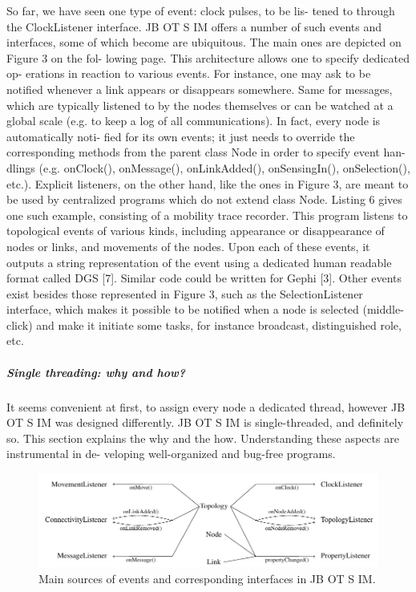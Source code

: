 So far, we have seen one type of event: clock pulses, to be lis- tened to through the ClockListener interface. JB OT S IM offers a number of such events and interfaces, some of which become are ubiquitous. The main ones are depicted on Figure 3 on the fol- lowing page. This architecture allows one to specify dedicated op- erations in reaction to various events. For instance, one may ask to be notified whenever a link appears or disappears somewhere. Same for messages, which are typically listened to by the nodes themselves or can be watched at a global scale (e.g. to keep a log of all communications). In fact, every node is automatically noti- fied for its own events; it just needs to override the corresponding methods from the parent class Node in order to specify event han- dlings (e.g. onClock(), onMessage(), onLinkAdded(), onSensingIn(), onSelection(), etc.). Explicit listeners, on the other hand, like the ones in Figure 3, are meant to be used by centralized programs which do not extend class Node. Listing 6 gives one such example, consisting of a mobility trace recorder. This program listens to topological events of various kinds, including appearance or disappearance of nodes or links, and movements of the nodes. Upon each of these events, it outputs a string representation of the event using a dedicated human readable format called DGS [7]. Similar code could be written for Gephi [3]. Other events exist besides those represented in Figure 3, such as the SelectionListener interface, which makes it possible to be notified when a node is selected (middle-click) and make it initiate some tasks, for instance broadcast, distinguished role, etc.
\subparagraph{Single threading: why and how?}It seems convenient at first, to assign every node a dedicated thread, however JB OT S IM was designed differently. JB OT S IM is single-threaded, and definitely so. This section explains the why and the how. Understanding these aspects are instrumental in de- veloping well-organized and bug-free programs.
\begin{figure}[h!]
	\centering
	\includegraphics[width=1\linewidth]{fig_4}
	\caption[Main sources of events and corresponding interfaces in JB OT S IM.]{Main sources of events and corresponding interfaces in JB OT S IM.}
	\label{fig:fig4}
\end{figure}

